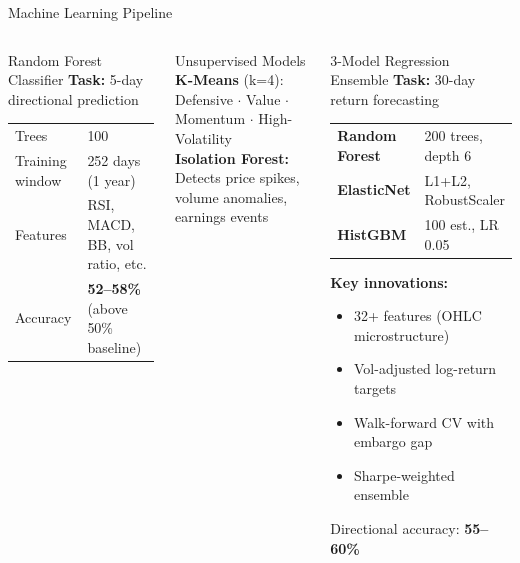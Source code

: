 \documentclass[aspectratio=169, 11pt]{beamer}
\begin{document}
\begin{frame}{Machine Learning Pipeline}
\begin{columns}[T]
\begin{block}{Random Forest Classifier}
\small
\textbf{Task:} 5-day directional prediction\\[0.1cm]
\footnotesize
\begin{tabular}{@{}ll@{}}
  Trees & 100 \\
  Training window & 252 days (1 year) \\
  Features & RSI, MACD, BB, vol ratio, etc. \\
  Accuracy & \textbf{52--58\%} (above 50\% baseline) \\
\end{tabular}
\end{block}

\vspace{0.15cm}
\begin{block}{Unsupervised Models}
\small
\textbf{K-Means} (k=4):\\
{\scriptsize Defensive $\cdot$ Value $\cdot$ Momentum $\cdot$ High-Volatility}\\[0.15cm]
\textbf{Isolation Forest:}\\
{\scriptsize Detects price spikes, volume anomalies, earnings events}
\end{block}

\begin{block}{3-Model Regression Ensemble}
\small
\textbf{Task:} 30-day return forecasting\\[0.1cm]
\footnotesize
\begin{tabular}{@{}ll@{}}
  \textcolor{ppAccent}{\textbf{Random Forest}} & 200 trees, depth 6 \\
  \textcolor{ppGreen}{\textbf{ElasticNet}} & L1+L2, RobustScaler \\
  \textcolor{ppCyan}{\textbf{HistGBM}} & 100 est., LR 0.05 \\
\end{tabular}

\vspace{0.2cm}
\textbf{Key innovations:}
\begin{itemize}\small
  \item 32+ features (OHLC microstructure)
  \item Vol-adjusted log-return targets
  \item Walk-forward CV with embargo gap
  \item Sharpe-weighted ensemble
\end{itemize}

\vspace{0.1cm}
Directional accuracy: \textbf{55--60\%}
\end{block}
\end{columns}
\end{frame}
\end{document}
